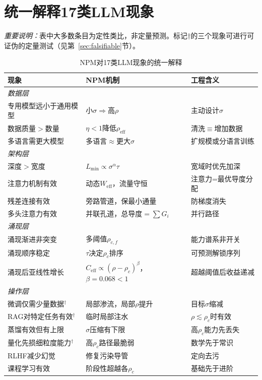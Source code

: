 \documentclass[11pt,a4paper]{article}
\newcommand{\Weff}{W_{\text{eff}}}
\newcommand{\Ceff}{C_{\text{eff}}}
\newcommand{\rhoc}{\rho_c}
\begin{document}
\section{统一解释17类LLM现象}

\emph{重要说明：}表中大多数条目为定性类比，非定量预测。标记$\dagger$的三个现象可进行可证伪的定量测试（见第~\ref{sec:falsifiable}节）。

\begin{table}[H]
\centering
\caption{NPM对17类LLM现象的统一解释}
\small
\begin{tabular}{p{4cm}p{4cm}p{4cm}}
\toprule
\textbf{现象} & \textbf{NPM机制} & \textbf{工程含义} \\
\midrule
\multicolumn{3}{l}{\textit{数据层}} \\
专用模型远小于通用模型 & 小$\sigma\Rightarrow$高$\rho$ & 主动设计$\sigma$ \\
数据质量$>$数量 & $\eta<1$降低$\rho_{\text{eff}}$ & 清洗$\equiv$增加数据 \\
多语言需更大模型 & 多语言$\approx$更大$\sigma$ & 扩规模或分语言训练 \\
\midrule
\multicolumn{3}{l}{\textit{架构层}} \\
深度$>$宽度 & $L_{\min}\propto\sigma^\alpha\tau$ & 宽域时优先加深 \\
注意力机制有效 & 动态$\Weff$，流量守恒 & 注意力=最优导度分配 \\
残差连接有效 & 旁路管道，保最小通量 & 防梯度消失 \\
多头注意力有效 & 并联孔道，总导度$=\sum G_i$ & 并行路径 \\
\midrule
\multicolumn{3}{l}{\textit{涌现层}} \\
涌现渐进非突变 & 多阈值$\rho_{c,f}$ & 能力谱系非开关 \\
涌现顺序稳定 & $\tau$决定$\rhoc$排序 & 可预测解锁序列 \\
涌现后亚线性增长 & $\Ceff\propto(\rho{-}\rhoc)^\beta$，$\beta=0.068<1$ & 超越阈值后收益递减 \\
\midrule
\multicolumn{3}{l}{\textit{操作层}} \\
微调仅需少量数据$^\dagger$ & 局部渗流，局部$\rho$提升 & 目标$\sigma$缩减 \\
RAG对特定任务有效$^\dagger$ & 临时局部注水 & $\rho\lesssim\rhoc$时有效 \\
蒸馏有效但有上限 & $\sigma$压缩有下限 & 高$\rhoc$能力先丢失 \\
量化先损细粒度能力$^\dagger$ & 高$\rhoc$路径最脆弱 & 数学先于常识 \\
RLHF减少幻觉 & 修复污染导管 & 定向去污 \\
课程学习有效 & 阶段性超越各$\rhoc$ & 基础先于进阶 \\
\bottomrule
\end{tabular}
\end{table}
\end{document}
